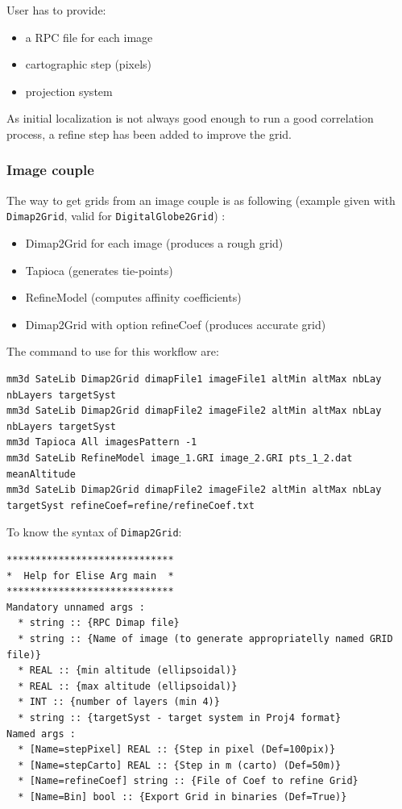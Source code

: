 User has to provide:
\begin{itemize}
\item a RPC file for each image
\item cartographic step (pixels)
\item projection system
\end{itemize}

As initial localization is not always good enough to run a good correlation process, a refine step has been added to improve the grid.

\subsubsection{Image couple}

The way to get grids from an image couple is as following (example given with {\tt Dimap2Grid}, valid for {\tt DigitalGlobe2Grid}) :

\begin{itemize}
\item Dimap2Grid for each image (produces a rough grid)
\item Tapioca (generates tie-points)
\item RefineModel (computes affinity coefficients)
\item Dimap2Grid with option refineCoef (produces accurate grid)
\end{itemize}

The command to use for this workflow are:
\begin{verbatim}
mm3d SateLib Dimap2Grid dimapFile1 imageFile1 altMin altMax nbLay  nbLayers targetSyst
mm3d SateLib Dimap2Grid dimapFile2 imageFile2 altMin altMax nbLay  nbLayers targetSyst
mm3d Tapioca All imagesPattern -1
mm3d SateLib RefineModel image_1.GRI image_2.GRI pts_1_2.dat meanAltitude
mm3d SateLib Dimap2Grid dimapFile2 imageFile2 altMin altMax nbLay targetSyst refineCoef=refine/refineCoef.txt
\end{verbatim}

To know the syntax of {\tt Dimap2Grid}:
\begin{verbatim}
*****************************
*  Help for Elise Arg main  *
*****************************
Mandatory unnamed args :
  * string :: {RPC Dimap file}
  * string :: {Name of image (to generate appropriatelly named GRID file)}
  * REAL :: {min altitude (ellipsoidal)}
  * REAL :: {max altitude (ellipsoidal)}
  * INT :: {number of layers (min 4)}
  * string :: {targetSyst - target system in Proj4 format}
Named args :
  * [Name=stepPixel] REAL :: {Step in pixel (Def=100pix)}
  * [Name=stepCarto] REAL :: {Step in m (carto) (Def=50m)}
  * [Name=refineCoef] string :: {File of Coef to refine Grid}
  * [Name=Bin] bool :: {Export Grid in binaries (Def=True)}

\end{verbatim}



